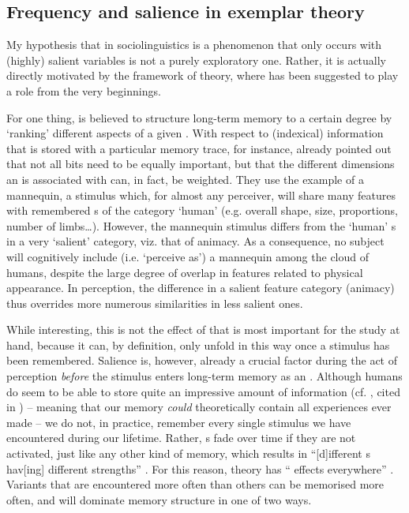 		\subsection{Frequency and salience in exemplar theory}
		\label{sec.sal.exemplar.freq}
		
My hypothesis that   in sociolinguistics is a phenomenon that only occurs with (highly) salient variables is not a purely exploratory one.
Rather, it is actually directly motivated by the framework of  theory, where  has been suggested to play a role from the very beginnings.

For one thing,  is believed to structure long-term memory to a certain degree by `ranking' different aspects of a given .
With respect to (indexical) information that is stored with a particular memory trace, for instance, \textcite[cf.][210--212]{medinschaffer1978} already pointed out that not all bits need to be equally important, but that the different dimensions an  is associated with can, in fact, be weighted.
They use the example of a mannequin, a stimulus which, for almost any perceiver, will share many features with remembered s of the category `human' (e.g. overall shape, size, proportions, number of limbs\ldots).
However, the mannequin stimulus differs from the `human' s in a very `salient' category, viz. that of animacy.
As a consequence, no subject will cognitively include (i.e. `perceive as') a mannequin among the  cloud of humans, despite the large degree of overlap in features related to physical appearance.
In perception, the difference in a salient feature category (animacy) thus overrides more numerous similarities in less salient ones.

While interesting, this is not the effect of  that is most important for the study at hand, because it can, by definition, only unfold in this way once a stimulus has been remembered.
Salience is, however, already a crucial factor during the act of perception \emph{before} the stimulus enters long-term memory as an .
Although humans do seem to be able to store quite an impressive amount of information (cf. \citealt{johnson2005}, cited in \citealt[44]{racz2013}) -- meaning that our memory \emph{could} theoretically contain all experiences ever made -- we do not, in practice, remember every single stimulus we have encountered during our lifetime.
Rather, s fade over time if they are not activated, just like any other kind of memory, which results in ``[d]ifferent s hav[ing] different strengths'' \parencite[cf.][115]{pierrehumbert2002}.
For this reason,  theory has `` effects everywhere'' \parencite[524]{pierrehumbert2006}.
Variants that are encountered more often than others can be memorised more often, and will dominate memory structure in one of two ways.

